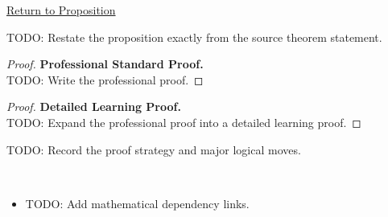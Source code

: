 \newpage
{}
\label{prf:monotone-discontinuities-first-kind}

\begin{remark*}[Return]
\hyperref[prop:monotone-discontinuities-first-kind]{Return to Proposition}
\end{remark*}

\begin{theorem*}
TODO: Restate the proposition exactly from the source theorem statement.
\end{theorem*}

\begin{proof}
\textbf{Professional Standard Proof.}~\\
TODO: Write the professional proof.
\end{proof}

\begin{proof}
\textbf{Detailed Learning Proof.}~\\
TODO: Expand the professional proof into a detailed learning proof.
\end{proof}

\begin{remark*}
TODO: Record the proof strategy and major logical moves.
\end{remark*}

\begin{remark*}[Dependencies]~\\
\begin{itemize}
  \item TODO: Add mathematical dependency links.
\end{itemize}
\end{remark*}

\clearpage
